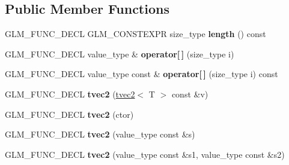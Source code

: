 \subsection*{Public Member Functions}
\begin{DoxyCompactItemize}
\item 
\hypertarget{structglm_1_1detail_1_1tvec2_ab6c8c9f40678f59192bd9cae5d462f12}{}G\+L\+M\+\_\+\+F\+U\+N\+C\+\_\+\+D\+E\+C\+L G\+L\+M\+\_\+\+C\+O\+N\+S\+T\+E\+X\+P\+R size\+\_\+type {\bfseries length} () const \label{structglm_1_1detail_1_1tvec2_ab6c8c9f40678f59192bd9cae5d462f12}

\item 
\hypertarget{structglm_1_1detail_1_1tvec2_abd2093679b295f0c184726c010f723e1}{}G\+L\+M\+\_\+\+F\+U\+N\+C\+\_\+\+D\+E\+C\+L value\+\_\+type \& {\bfseries operator\mbox{[}$\,$\mbox{]}} (size\+\_\+type i)\label{structglm_1_1detail_1_1tvec2_abd2093679b295f0c184726c010f723e1}

\item 
\hypertarget{structglm_1_1detail_1_1tvec2_aa3aece5c9e3a8239e95e748974bcf2c5}{}G\+L\+M\+\_\+\+F\+U\+N\+C\+\_\+\+D\+E\+C\+L value\+\_\+type const \& {\bfseries operator\mbox{[}$\,$\mbox{]}} (size\+\_\+type i) const \label{structglm_1_1detail_1_1tvec2_aa3aece5c9e3a8239e95e748974bcf2c5}

\item 
\hypertarget{structglm_1_1detail_1_1tvec2_a538a7f92f8c9b22ac624226ea1f48e3a}{}G\+L\+M\+\_\+\+F\+U\+N\+C\+\_\+\+D\+E\+C\+L {\bfseries tvec2} (\hyperlink{structglm_1_1detail_1_1tvec2}{tvec2}$<$ T $>$ const \&v)\label{structglm_1_1detail_1_1tvec2_a538a7f92f8c9b22ac624226ea1f48e3a}

\item 
\hypertarget{structglm_1_1detail_1_1tvec2_a17c66b75e5ad0d2c5c6c2cedd67dd4a8}{}G\+L\+M\+\_\+\+F\+U\+N\+C\+\_\+\+D\+E\+C\+L {\bfseries tvec2} (ctor)\label{structglm_1_1detail_1_1tvec2_a17c66b75e5ad0d2c5c6c2cedd67dd4a8}

\item 
\hypertarget{structglm_1_1detail_1_1tvec2_acc4a526f25f000d09ae31159e5e9069f}{}G\+L\+M\+\_\+\+F\+U\+N\+C\+\_\+\+D\+E\+C\+L {\bfseries tvec2} (value\+\_\+type const \&s)\label{structglm_1_1detail_1_1tvec2_acc4a526f25f000d09ae31159e5e9069f}

\item 
\hypertarget{structglm_1_1detail_1_1tvec2_a3da5a34afeb3d8aa42ffc449e51ce3a1}{}G\+L\+M\+\_\+\+F\+U\+N\+C\+\_\+\+D\+E\+C\+L {\bfseries tvec2} (value\+\_\+type const \&s1, value\+\_\+type const \&s2)\label{structglm_1_1detail_1_1tvec2_a3da5a34afeb3d8aa42ffc449e51ce3a1}


\end{DoxyCompactItemize}
